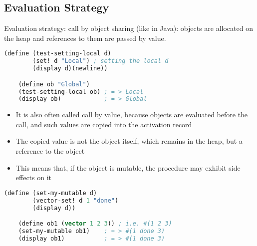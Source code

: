 \subsection{Evaluation Strategy}
Evaluation strategy: call by object sharing (like in Java): objects are allocated on the heap and references to them are passed by value.
\begin{lstlisting}[language=Lisp]
    (define (test-setting-local d)
        (set! d "Local") ; setting the local d
        (display d)(newline))

    (define ob "Global")
    (test-setting-local ob) ; = > Local
    (display ob)            ; = > Global
\end{lstlisting}
\begin{itemize}
    \item It is also often called call by value, because objects are evaluated before the call, and such values are copied into the activation record
    \item The copied value is not the object itself, which remains in the heap, but a reference to the object
    \item This means that, if the object is mutable, the procedure may exhibit side effects on it
\end{itemize}
\begin{lstlisting}[language=Lisp]
    (define (set-my-mutable d)
        (vector-set! d 1 "done")
        (display d))

    (define ob1 (vector 1 2 3)) ; i.e. #(1 2 3)
    (set-my-mutable ob1)    ; = > #(1 done 3)
    (display ob1)           ; = > #(1 done 3)
\end{lstlisting}

